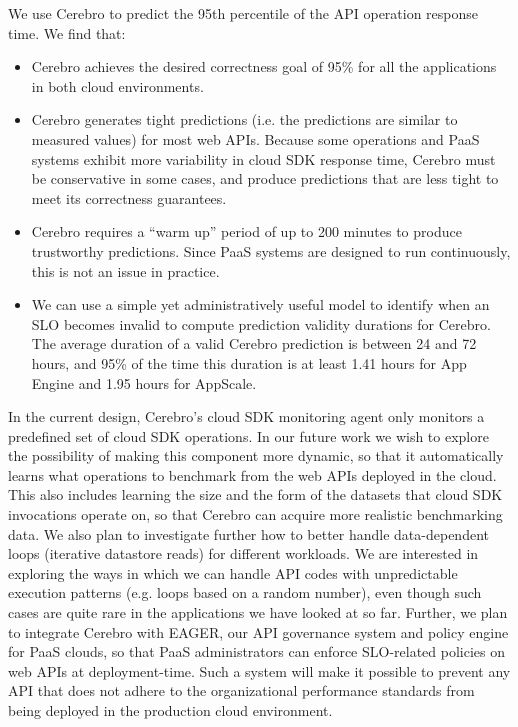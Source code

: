We use Cerebro to predict the 95th percentile of the API operation response time. 
We find that:
\begin{itemize}
\item Cerebro achieves the desired correctness goal of 95\% for all the applications in both cloud environments.
\item Cerebro generates tight predictions (i.e.
the predictions are similar to measured values) for most web APIs.  Because
some operations and PaaS systems exhibit more variability in cloud SDK response
time, 
Cerebro must be conservative in some cases, and produce predictions that are less tight
to meet its correctness guarantees.  
\item Cerebro requires a ``warm up'' period of up to 200 minutes to produce trustworthy 
predictions. Since PaaS systems are designed to run continuously, this is not an issue in practice. 
\item We can use a simple yet administratively useful model to identify when an 
SLO becomes invalid to compute
prediction validity durations for Cerebro.  The average duration of a valid
Cerebro prediction is between 24 and 72 hours,
and 95\% of the time this duration is at least 
1.41 hours for App Engine and 1.95 hours for AppScale.
\end{itemize}

In the current design, Cerebro's cloud SDK monitoring agent only monitors 
a predefined set of cloud SDK operations. In our future work we wish 
to explore the possibility of making this component more dynamic,
so that it automatically learns what operations to benchmark from the web APIs 
deployed in the cloud. This also includes learning the size and the form of the datasets
that cloud SDK invocations operate on, so that Cerebro can acquire more realistic
benchmarking data. We also plan to investigate further how to better
handle data-dependent loops (iterative datastore reads) for different workloads. We are interested
in exploring the ways in which we can handle API codes with unpredictable execution patterns (e.g.
loops based on a random number), even though such cases are quite rare in the applications we
have looked at so far.
Further, we plan
to integrate Cerebro with EAGER, our API governance system 
and policy engine for PaaS clouds, so 
that PaaS administrators can enforce SLO-related policies on web APIs at deployment-time.
Such a system will make it possible to prevent any API that 
does not adhere to the organizational performance
standards from being deployed in the production cloud environment.
